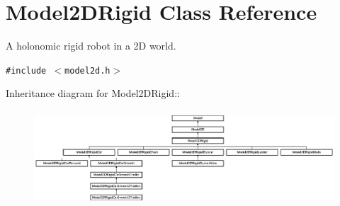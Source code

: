 \section{Model2DRigid  Class Reference}
\label{class_Model2DRigid}
A holonomic rigid robot in a 2D world. 


{\tt \#include $<$model2d.h$>$}

Inheritance diagram for Model2DRigid::\begin{figure}[H]
\begin{center}
\leavevmode
\includegraphics[height=3.5387cm]{class_Model2DRigid}
\end{center}
\end{figure}
